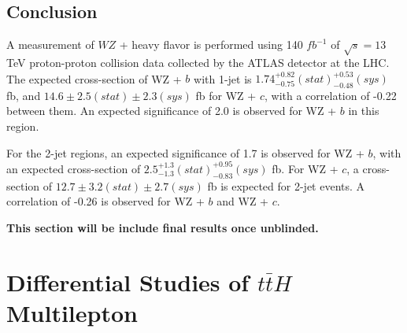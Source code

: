 \documentclass[12pt]{report}	%
\theoremstyle{definition}
\theoremstyle{remark}
\begin{document}
\section{Conclusion}
\label{sec:conclusion}

A measurement of $WZ$ + heavy flavor is performed using 140 $fb^{-1}$ of $\sqrt{s} = 13$ TeV proton-proton collision data collected by the ATLAS detector at the LHC. The expected cross-section of WZ + $b$ with 1-jet is $1.74^{+0.82}_{-0.75}(stat)^{+0.53}_{-0.48}(sys)$ fb, and $14.6 \pm 2.5 (stat) \pm 2.3 (sys)$ fb for WZ + $c$, with a correlation of -0.22 between them. An expected significance of 2.0 is observed for WZ + $b$ in this region.

For the 2-jet regions, an expected significance of 1.7 is observed for WZ + $b$, with an expected cross-section of $2.5^{+1.3}_{-1.3}(stat)^{+0.95}_{-0.83}(sys)$ fb. For WZ + $c$, a cross-section of $12.7 \pm 3.2 (stat) \pm 2.7 (sys)$ fb is expected for 2-jet events. A correlation of -0.26 is observed for WZ + $b$ and WZ + $c$.

\textbf{This section will be include final results once unblinded.}


\chapter{Differential Studies of $t\bar{t}H$ Multilepton }
\label{part:analysis}


%


%
\end{document}
